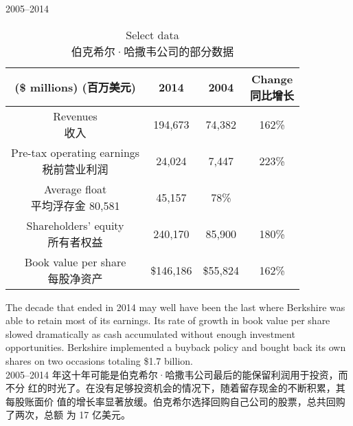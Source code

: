 \begin{section}{2005--2014}

\begin{table}[!htbp]
  \centering
  \begin{center}
    \begin{tabular}{cccc}
      \toprule
      \makecell[c]{(\$ millions) \\ (百万美元)} & 2014 & 2004 & \makecell[c]{Change \\ 同比增长} \\
      \midrule
      \makecell[c]{Revenues \\ 收入} & 194,673 & 74,382 & 162\% \\
      \makecell[c]{Pre-tax operating earnings \\ 税前营业利润} & 24,024 & 7,447 & 223\% \\
      \makecell[c]{Average float \\ 平均浮存金} 80,581 & 45,157 & 78\% \\
      \makecell[c]{Shareholders' equity \\ 所有者权益} & 240,170 & 85,900 & 180\% \\
      \makecell[c]{Book value per share \\ 每股净资产} & \$146,186 & \$55,824 & 162\% \\
      \bottomrule
    \end{tabular}
    \caption{Select data \\ 伯克希尔·哈撒韦公司的部分数据}
  \end{center}
\end{table}

\begin{verseparallel}
  {
    The decade that ended in 2014 may well have been the last where Berkshire
    was able to retain most of its earnings. Its rate of growth in book value
    per share slowed dramatically as cash accumulated without enough investment
    opportunities. Berkshire implemented a buyback policy and bought back its
    own shares on two occasions totaling \$1.7 billion. \\
  }
  {
    2005--2014 年这十年可能是伯克希尔·哈撒韦公司最后的能保留利润用于投资，而不分
    红的时光了。在没有足够投资机会的情况下，随着留存现金的不断积累，其每股账面价
    值的增长率显著放缓。伯克希尔选择回购自己公司的股票，总共回购了两次，总额
    为 17 亿美元。
  }
\end{verseparallel}


\end{section}
